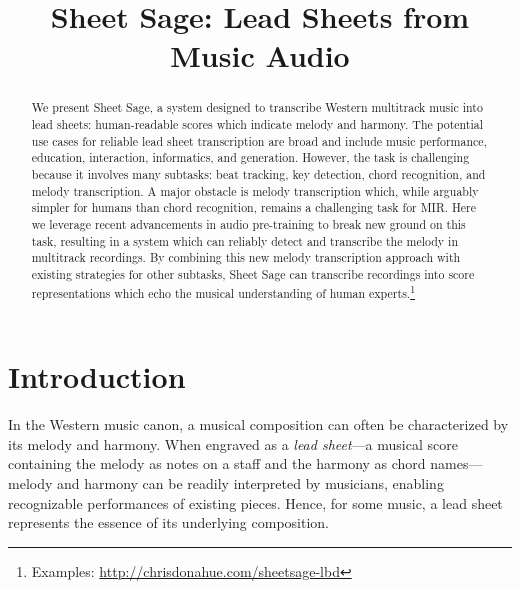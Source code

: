 \documentclass{article}
\title{
Sheet Sage: Lead Sheets from Music Audio
}
\begin{document}
\maketitle

\begin{abstract}

We present Sheet Sage, 
a system designed to transcribe Western multitrack music into lead sheets: human-readable scores which indicate melody and harmony. 
The potential use cases for reliable lead sheet transcription are broad and include 
music performance, 
education, 
interaction, 
informatics, 
and generation. 
However, the task is challenging because it involves many subtasks: 
beat tracking, 
key detection, 
chord recognition,
and melody transcription. 
A major obstacle is melody transcription which, 
while arguably simpler for humans than chord recognition, 
remains a challenging task for MIR. 
Here we leverage recent advancements in audio pre-training to break new ground on this task, 
resulting in a system which can reliably detect and transcribe the melody in multitrack recordings. 
By combining this new melody transcription approach with existing strategies for other subtasks, 
Sheet Sage can transcribe recordings into score representations which echo the musical understanding of human experts.\footnote{Examples: \url{http://chrisdonahue.com/sheetsage-lbd}\label{footnote:examples}}
\end{abstract}

\section{Introduction}\label{sec:introduction}

In the Western music canon, 
a musical composition can often be characterized by its melody and harmony. 
When engraved as a \emph{lead sheet}---a musical score containing the melody as notes on a staff and the harmony as chord names---melody and harmony can be readily interpreted by musicians, enabling recognizable performances of existing pieces. 
Hence, for some music, a lead sheet represents the essence of its underlying composition.
\end{document}
